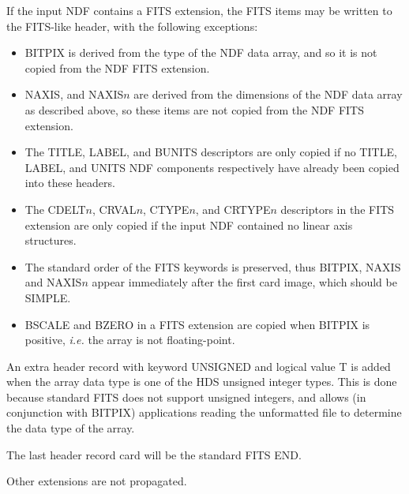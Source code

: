 {{{{            \sstitem
               If the input NDF contains a FITS extension, the FITS items
               may be written to the FITS-like header, with the following
               exceptions:
               \begin{itemize}
               \item BITPIX is derived from the type of the NDF data array,
               and so it is not copied from the NDF FITS extension.
               \item NAXIS, and NAXIS$n$ are derived from the dimensions of the
               NDF data array as described above, so these items are not
               copied from the NDF FITS extension.
               \item The TITLE, LABEL, and BUNITS descriptors are only copied
               if no TITLE, LABEL, and UNITS NDF components respectively
               have already been copied into these headers.
               \item The CDELT$n$, CRVAL$n$, CTYPE$n$, and CRTYPE$n$ descriptors
               in the FITS extension are only copied if the input NDF
               contained no linear axis structures.
               \item The standard order of the FITS keywords is preserved,
               thus BITPIX, NAXIS and NAXIS$n$ appear immediately after the
               first card image, which should be SIMPLE.
               \item BSCALE and BZERO in a FITS extension are copied when
               BITPIX is positive, {\it i.e.} the array is not floating-point.
               \end{itemize}

            \sstitem
               An extra header record with keyword UNSIGNED and logical
               value T is added when the array data type is one of the HDS
               unsigned integer types.  This is done because standard FITS
               does not support unsigned integers, and allows (in conjunction
               with BITPIX) applications reading the unformatted file to
               determine the data type of the array.

            \sstitem
               The last header record card will be the standard FITS END.
         }

         \sstitem
            Other extensions are not propagated.
      }
   }
}
